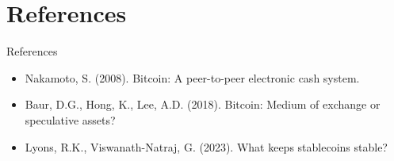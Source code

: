 \documentclass[9pt, aspectratio=169, t]{beamer}
\theoremstyle{definition}
\begin{document}
\section{References}

\begin{frame}{References}
    \begin{itemize}
        \item Nakamoto, S. (2008). Bitcoin: A peer-to-peer electronic cash system.
        \item Baur, D.G., Hong, K., Lee, A.D. (2018). Bitcoin: Medium of exchange or speculative assets?
        \item Lyons, R.K., Viswanath-Natraj, G. (2023). What keeps stablecoins stable?
    \end{itemize}
\end{frame}
\end{document}

